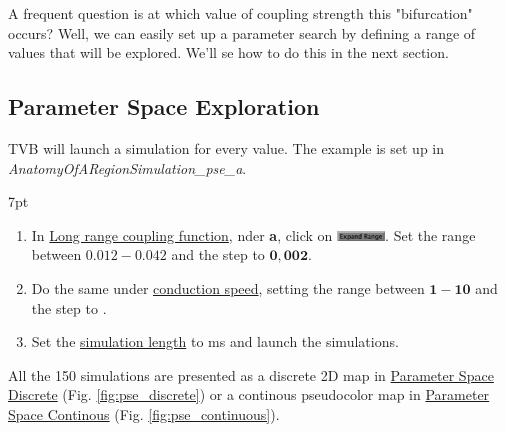 \documentclass{tufte-handout}
\newenvironment{simulation}{%
  \def\FrameCommand{%
    \hspace{1pt}%
    {\color{ForestGreen}\vrule width 2pt}%
    {\color{simulationshade}\vrule width 4pt}%
    \colorbox{simulationshade}%
  }%
  \MakeFramed{\advance\hsize-\width\FrameRestore}%
  \noindent\hspace{-4.55pt}%
  \begin{adjustwidth}{}{7pt}%
  \vspace{2pt}\vspace{2pt}%
}
{%
  \vspace{2pt}\end{adjustwidth}\endMakeFramed%
}
\begin{document}
A frequent question is at which value of coupling strength this
"bifurcation" occurs? Well, we can easily set up a parameter search by defining a
range of values that will be explored. We'll se how to do this in the next section.

 
\subsection{Parameter Space Exploration}\label{sec:pse}

TVB will launch a simulation for
every value.  The example is set up in \textit{AnatomyOfARegionSimulation\_pse\_a}. 

\begin{simulation}
\begin{enumerate}
 \item In \underline{Long range coupling function}, nder \textbf{a}, click on \includegraphics[width=0.1\textwidth]{butt_expand_range.png}. 
 Set the range between $\mathbf{0.012-0.042}$ and the step to $\mathbf{0,002}$.
 \item Do the same under \underline{conduction speed}, setting the range between $\mathbf{1-10}$  and the step to \textbf{}.
 
 \item Set the \underline{simulation length} to \unit[2000]{ms} and launch the simulations.
\end{enumerate}
\end{simulation}

\newpage

All the 150 simulations are presented as a discrete 2D map in \underline{Parameter Space Discrete} (Fig. \ref{fig:pse_discrete}) or a continous pseudocolor map in \underline{Parameter Space Continous} (Fig. \ref{fig:pse_continuous}). 
\end{document}

